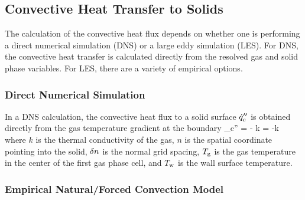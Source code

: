 \subsection{Convective Heat Transfer to Solids}
\label{conflux}

The calculation of the convective heat flux depends on whether one is performing a direct numerical simulation (DNS) or a large eddy simulation (LES). For DNS, the convective heat transfer is calculated directly from the resolved gas and solid phase variables. For LES, there are a variety of empirical options.

\subsubsection{Direct Numerical Simulation}

In a DNS calculation, the convective heat flux to a solid surface $\dot{q}''_{\rm c}$ is obtained directly from the gas temperature gradient at the boundary
\be
   \dq_{\rm c}'' = - k \;  = -k 
\ee
where $k$ is the thermal conductivity of the gas, $n$ is the spatial coordinate pointing into the solid, $\delta n$ is the normal grid spacing, $T_{\rm g}$ is the gas temperature in the center of the first gas phase cell, and $T_{\rm w}$ is the wall surface temperature.

\subsubsection{Empirical Natural/Forced Convection Model}

